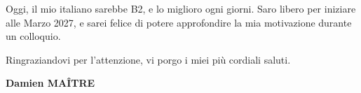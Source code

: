 \documentclass[a4paper,11pt]{extarticle}
\begin{document}
Oggi, il mio italiano sarebbe B2, e lo miglioro ogni giorni. Saro libero per iniziare alle Marzo 2027, e sarei felice di potere approfondire la mia motivazione durante un colloquio.

Ringraziandovi per l'attenzione, vi porgo i miei più cordiali saluti.
\vspace{14pt}
\begin{flushright}
  \textbf{\color{accent}Damien MAÎTRE}
\end{flushright}
\end{document}
